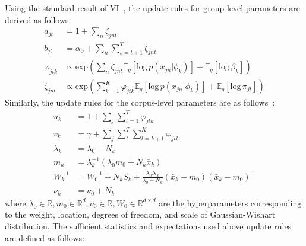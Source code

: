 \documentclass{article}
\begin{document}
Using the standard result of VI~\cite{DBLP:journals/jei/BishopN07, 10.1214/06-BA104, DBLP:journals/jmlr/WangPB11}, the update rules for group-level parameters are derived as follows:
\begin{align}
\label{eq:doc_update:a} a_{jt} &= \textstyle 1 +  \sum_{n}\zeta_{jnt} \\
\label{eq:doc_update:b} b_{jt} &= \textstyle \alpha_{0} +  \sum_{n}\sum^{T}_{s=t+1}\zeta_{jnt} \\
\label{eq:doc_update:varphi} \varphi_{jtk} &\propto \text{exp}(\textstyle \sum_{n}\zeta_{jnt}\mathbb{E}_{q}[\text{log}\,p(x_{jn}|\phi_{k})] + \mathbb{E}_{q}[\text{log}\,\beta_{k}]) \\
\label{eq:doc_update:zeta} \zeta_{jnt} &\propto \text{exp}(\textstyle \sum_{k=1}^{K} \varphi_{jtk} \mathbb{E}_{q}[\text{log}\,p(x_{jn}|\phi_{k})] + \mathbb{E}_{q}[\text{log}\,\pi_{jt}])
\end{align}
Similarly, the update rules for the corpus-level parameters are as follows~\cite{DBLP:journals/jei/BishopN07}:
\begin{align}
\label{eq:corpus_update:u} u_{k} &= 1 + \textstyle \sum_{j}\sum_{t=1}^{T} \varphi_{jtk} \\
\label{eq:corpus_update:v} v_{k} &= \gamma + \textstyle \sum_{j}\sum_{t}^{T}\sum_{l=k+1}^{K} \varphi_{jtl} \\
\label{eq:corpus_update:lambda} \lambda_{k} &= \lambda_{0} + N_{k} \\
\label{eq:corpus_update:m} m_{k} &= \lambda_{k}^{-1} (\lambda_{0}m_{0} + N_{k}\bar{x}_{k}) \\
\label{eq:corpus_update:W} W_{k}^{-1} &= W_{0}^{-1} + N_{k}S_{k} + \frac{\lambda_{0}N_{k}}{\lambda_{0} + N_{k}} (\bar{x}_{k} - m_{0})(\bar{x}_{k} - m_{0})^{\intercal} \\
\label{eq:corpus_update:nu} \nu_{k} &= \nu_{0} + N_{k}
\end{align}
where $\lambda_{0}\in\mathbb{R}, m_{0}\in\mathbb{R}^{d}, \nu_{0}\in\mathbb{R}, W_{0}\in\mathbb{R}^{d\times d}$ are the hyperparameters corresponding to the weight, location, degrees of freedom, and scale of Gaussian-Wishart distribution. The sufficient statistics and expectations used above update rules are defined as follows:
\end{document}
